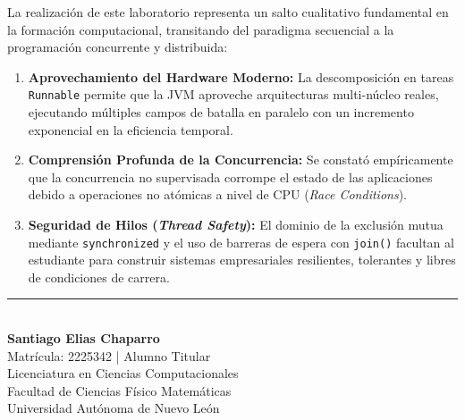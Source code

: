 \documentclass[11pt,letterpaper]{article}
\begin{document}
La realización de este laboratorio representa un salto cualitativo fundamental en la formación computacional, transitando del paradigma secuencial a la programación concurrente y distribuida:

\begin{enumerate}[leftmargin=1.5cm]
    \item \textbf{Aprovechamiento del Hardware Moderno:} La descomposición en tareas \texttt{Runnable} permite que la JVM aproveche arquitecturas multi-núcleo reales, ejecutando múltiples campos de batalla en paralelo con un incremento exponencial en la eficiencia temporal.
    \item \textbf{Comprensión Profunda de la Concurrencia:} Se constató empíricamente que la concurrencia no supervisada corrompe el estado de las aplicaciones debido a operaciones no atómicas a nivel de CPU (\textit{Race Conditions}).
    \item \textbf{Seguridad de Hilos (\textit{Thread Safety}):} El dominio de la exclusión mutua mediante \texttt{synchronized} y el uso de barreras de espera con \texttt{join()} facultan al estudiante para construir sistemas empresariales resilientes, tolerantes y libres de condiciones de carrera.
\end{enumerate}

\vspace{1.5cm}
\begin{center}
    \rule{8cm}{0.4pt}\\[0.2cm]
    \textbf{Santiago Elias Chaparro}\\
    \small Matrícula: 2225342 | Alumno Titular\\
    Licenciatura en Ciencias Computacionales\\
    Facultad de Ciencias Físico Matemáticas\\
    Universidad Autónoma de Nuevo León
\end{center}
\end{document}
